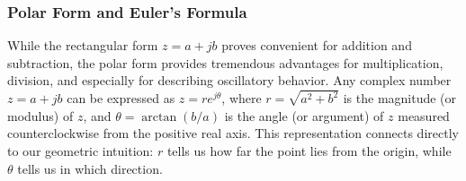 \subsubsection{Polar Form and Euler's Formula}

While the rectangular form $z = a + jb$ proves convenient for addition and subtraction, the polar form provides tremendous advantages for multiplication, division, and especially for describing oscillatory behavior. Any complex number $z = a + jb$ can be expressed as $z = re^{j\theta}$, where $r = \sqrt{a^2 + b^2}$ is the magnitude (or modulus) of $z$, and $\theta = \arctan(b/a)$ is the angle (or argument) of $z$ measured counterclockwise from the positive real axis. This representation connects directly to our geometric intuition: $r$ tells us how far the point lies from the origin, while $\theta$ tells us in which direction.

